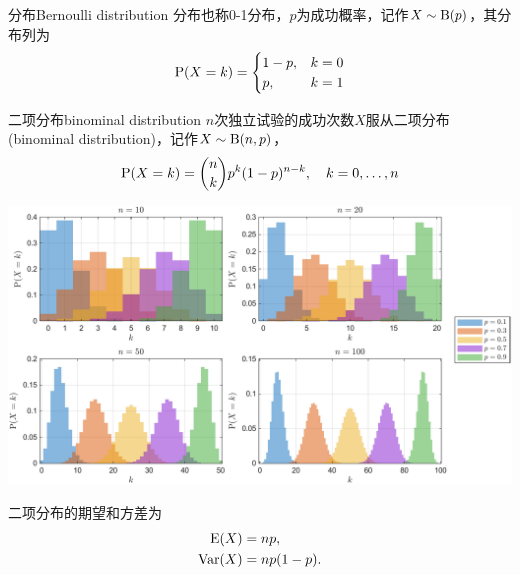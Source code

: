 \begin{definition}{\Bern 分布}{Bernoulli distribution}
	\Bern 分布也称0-1分布，$p$为成功概率，记作$X\sim\Bino(p)$，其分布列为
	\begin{equation}
		\P(X=k)=\begin{cases}
			1-p,&k=0\\
			p,&k=1
		\end{cases}
	\end{equation}
\end{definition}

\begin{definition}{二项分布}{binominal distribution}
	$n$次独立\Bern 试验的成功次数$X$服从二项分布(binominal distribution)，记作$X\sim\Bino(n,p)$，
	\begin{equation}
		\P(X=k)=\binom nk p^k(1-p)^{n-k},\quad k=0,\ldots,n
	\end{equation}
	\begin{center}
		\includegraphics[width=.95\textwidth]{figures/pdf_bin.pdf}
	\end{center}
\end{definition}

\begin{corollary}
	二项分布的期望和方差为
	\begin{subequations}
		\begin{align}
			\E(X)&=np,\\
			\Var(X)&=np(1-p).
		\end{align}
	\end{subequations}
\end{corollary}

